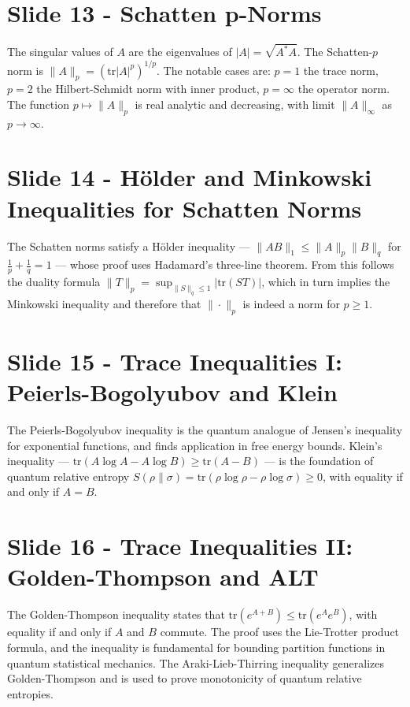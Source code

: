 \documentclass{article}
\begin{document}
\section*{Slide 13 - Schatten p-Norms}
The singular values of $A$ are the eigenvalues of $|A| = \sqrt{A^*A}$. \newline The Schatten-$p$ norm is $\|A\|_p = (\mathrm{tr}|A|^p)^{1/p}$. The notable cases are: $p=1$ the trace norm, $p=2$ the Hilbert-Schmidt norm with inner product, $p=\infty$ the operator norm. The function $p \mapsto \|A\|_p$ is real analytic and decreasing, with limit $\|A\|_\infty$ as $p \to \infty$.

\section*{Slide 14 - Hölder and Minkowski Inequalities for Schatten Norms}
The Schatten norms satisfy a Hölder inequality — $\|AB\|_1 \leq \|A\|_p \|B\|_q$
for $\frac{1}{p}+\frac{1}{q}=1$ — whose proof uses Hadamard's three-line theorem. From this follows the duality formula $\|T\|_p = \sup_{\|S\|_q \leq 1} |\mathrm{tr}(ST)|$, which in turn implies the Minkowski inequality and therefore that $\|\cdot\|_p$ is indeed a norm for $p \geq 1$.

\section*{Slide 15 - Trace Inequalities I: Peierls-Bogolyubov and Klein}
The Peierls-Bogolyubov inequality is the quantum analogue of Jensen's inequality for exponential functions, and finds application in free energy bounds. \newline Klein's inequality — $\mathrm{tr}(A \log A - A \log B) \geq \mathrm{tr}(A - B)$ — is the foundation of quantum relative entropy $S(\rho \| \sigma) = \mathrm{tr}(\rho \log \rho - \rho \log \sigma) \geq 0$, with equality if and only if $A = B$.

\section*{Slide 16 - Trace Inequalities II: Golden-Thompson and ALT}
The Golden-Thompson inequality states that $\mathrm{tr}(e^{A+B}) \leq \mathrm{tr}(e^A e^B)$, with equality if and only if $A$ and $B$ commute. The proof uses the Lie-Trotter product formula, and the inequality is fundamental for bounding partition functions in quantum statistical mechanics. The Araki-Lieb-Thirring inequality generalizes Golden-Thompson and is used to prove monotonicity of quantum relative entropies.
\end{document}
